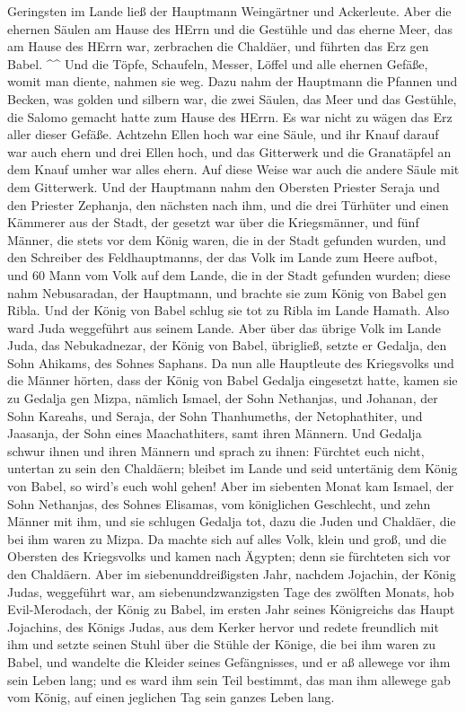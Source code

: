 Geringsten im Lande ließ der Hauptmann Weingärtner und Ackerleute.
 Aber die ehernen Säulen am Hause des HErrn und die
Gestühle und das eherne Meer, das am Hause des HErrn war, zerbrachen die
Chaldäer, und führten das Erz gen Babel. \^{}\^{}  Und die
Töpfe, Schaufeln, Messer, Löffel und alle ehernen Gefäße, womit man
diente, nahmen sie weg.  Dazu nahm der Hauptmann die
Pfannen und Becken, was golden und silbern war,  die zwei
Säulen, das Meer und das Gestühle, die Salomo gemacht hatte zum Hause
des HErrn. Es war nicht zu wägen das Erz aller dieser Gefäße.
 Achtzehn Ellen hoch war eine Säule, und ihr Knauf darauf
war auch ehern und drei Ellen hoch, und das Gitterwerk und die
Granatäpfel an dem Knauf umher war alles ehern. Auf diese Weise war auch
die andere Säule mit dem Gitterwerk.  Und der Hauptmann
nahm den Obersten Priester Seraja und den Priester Zephanja, den
nächsten nach ihm, und die drei Türhüter  und einen
Kämmerer aus der Stadt, der gesetzt war über die Kriegsmänner, und fünf
Männer, die stets vor dem König waren, die in der Stadt gefunden wurden,
und den Schreiber des Feldhauptmanns, der das Volk im Lande zum Heere
aufbot, und 60 Mann vom Volk auf dem Lande, die in der Stadt gefunden
wurden;  diese nahm Nebusaradan, der Hauptmann, und brachte
sie zum König von Babel gen Ribla.  Und der König von Babel
schlug sie tot zu Ribla im Lande Hamath. Also ward Juda weggeführt aus
seinem Lande.  Aber über das übrige Volk im Lande Juda, das
Nebukadnezar, der König von Babel, übrigließ, setzte er Gedalja, den
Sohn Ahikams, des Sohnes Saphans.  Da nun alle Hauptleute
des Kriegsvolks und die Männer hörten, dass der König von Babel Gedalja
eingesetzt hatte, kamen sie zu Gedalja gen Mizpa, nämlich Ismael, der
Sohn Nethanjas, und Johanan, der Sohn Kareahs, und Seraja, der Sohn
Thanhumeths, der Netophathiter, und Jaasanja, der Sohn eines
Maachathiters, samt ihren Männern.  Und Gedalja schwur
ihnen und ihren Männern und sprach zu ihnen: Fürchtet euch nicht,
untertan zu sein den Chaldäern; bleibet im Lande und seid untertänig dem
König von Babel, so wird's euch wohl gehen!  Aber im
siebenten Monat kam Ismael, der Sohn Nethanjas, des Sohnes Elisamas, vom
königlichen Geschlecht, und zehn Männer mit ihm, und sie schlugen
Gedalja tot, dazu die Juden und Chaldäer, die bei ihm waren zu Mizpa.
 Da machte sich auf alles Volk, klein und groß, und die
Obersten des Kriegsvolks und kamen nach Ägypten; denn sie fürchteten
sich vor den Chaldäern.  Aber im siebenunddreißigsten Jahr,
nachdem Jojachin, der König Judas, weggeführt war, am
siebenundzwanzigsten Tage des zwölften Monats, hob Evil-Merodach, der
König zu Babel, im ersten Jahr seines Königreichs das Haupt Jojachins,
des Königs Judas, aus dem Kerker hervor  und redete
freundlich mit ihm und setzte seinen Stuhl über die Stühle der Könige,
die bei ihm waren zu Babel,  und wandelte die Kleider
seines Gefängnisses, und er aß allewege vor ihm sein Leben lang;
 und es ward ihm sein Teil bestimmt, das man ihm allewege
gab vom König, auf einen jeglichen Tag sein ganzes Leben lang.
